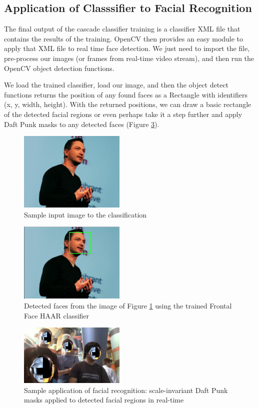 \documentclass[journal]{IEEEtran}
\begin{document}
\subsection{Application of Classsifier to Facial Recognition}
The final output of the cascade classifier training is a classifier XML file that contains the results of the training. OpenCV then provides an easy module to apply that XML file to real time face detection. We just need to import the file, pre-process our images (or frames from real-time video stream), and then run the OpenCV object detection functions.
\par We load the trained classifier, load our image, and then the object detect functions returns the position of any found faces as a Rectangle with identifiers (x, y, width, height). With the returned positions, we can draw a basic rectangle of the detected facial regions or even perhaps take it a step further and apply Daft Punk masks to any detected faces (Figure \ref{daft-punk-masks}).
\begin{figure}[H]
	\centering
	\includegraphics[width=0.45\textwidth]{richb.jpg}
	\caption{Sample input image to the classification}
    \label{richb}
\end{figure}
\begin{figure}[H]
	\centering
	\includegraphics[width=0.45\textwidth]{richb_face_detected.png}
	\caption{Detected faces from the image of Figure \ref{richb} using the trained Frontal Face HAAR classifier}
    \label{richb-face-detected}
\end{figure}
\begin{figure}[h]
	\centering
	\includegraphics[width=0.45\textwidth]{daft_punk_masks.png}
	\caption{Sample application of facial recognition: scale-invariant Daft Punk masks applied to detected facial regions in real-time}
    \label{daft-punk-masks}
\end{figure}
\end{document}
